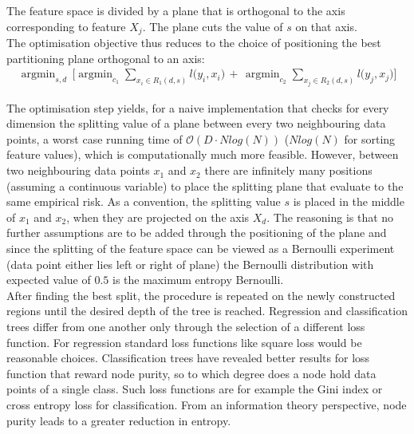 \documentclass[a4paper, 11pt]{article}
\DeclareMathOperator*{\argmin}{argmin} %
\begin{document}
The feature space is divided by a plane that is orthogonal to the axis corresponding to feature $X_j$. The plane cuts the value of $s$ on that axis.\\
The optimisation objective thus reduces to the choice of positioning  the best partitioning plane orthogonal to an axis:
\begin{align*}
\argmin_{s, d}\,\Big[\argmin_{c_1} \sum_{x_i \in R_1(d,s)} l\big(y_i, x_i\big)\, +\, \argmin_{c_2} \sum_{x_j \in R_2(d,s)} l\big(y_j, x_j\big)\Big]
\end{align*}

The optimisation step yields, for a naive implementation that checks for every dimension the splitting value of a plane between every two neighbouring data points, a worst case running time of $\mathcal{O}(D \cdot N log(N))$ ($Nlog(N)$ for sorting feature values), which is computationally much more feasible. However, between two neighbouring data points $x_1$ and $x_2$ there are infinitely many positions (assuming a continuous variable) to place the splitting plane that evaluate to the same empirical risk. As a convention, the splitting value $s$ is placed in the middle of $x_1$ and $x_2$, when they are projected on the axis $X_d$. The reasoning is that no further assumptions are to be added through the positioning of the plane and since the splitting of the feature space can be viewed as a Bernoulli experiment (data point either lies left or right of plane) the Bernoulli distribution with expected value of $0.5$ is the maximum entropy Bernoulli.\\

After finding the best split, the procedure is repeated on the newly constructed regions until the desired depth of the tree is reached. Regression and classification trees differ from one another only through the selection of a different loss function. For regression standard loss functions like square loss would be reasonable choices. Classification trees have revealed better results for loss function that reward node purity, so to which degree does a node hold data points of a single class. Such loss functions are for example the Gini index or cross entropy loss for classification. From an information theory perspective, node purity leads to a greater reduction in entropy.\\
\end{document}
